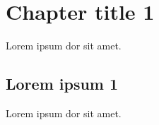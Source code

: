 \documentclass[
    titlepage,numbers=noenddot,headinclude,
    footinclude=true,cleardoublepage=empty,
    dottedtoc,
    BCOR=5mm,paper=a4,fontsize=11pt,
]{scrreprt}
\title{\docTitle}
\author{\authorName}
\begin{document}
\pagestyle{scrheadings}
\maketitle
\cleardoublepage

\tableofcontents
\thispagestyle{empty}
\cleardoublepage
\setcounter{page}{1} %

\chapter{Chapter title 1}
Lorem ipsum dor sit amet.%

\cleardoublepage

\section{Lorem ipsum 1}
Lorem ipsum dor sit amet.
\end{document}
